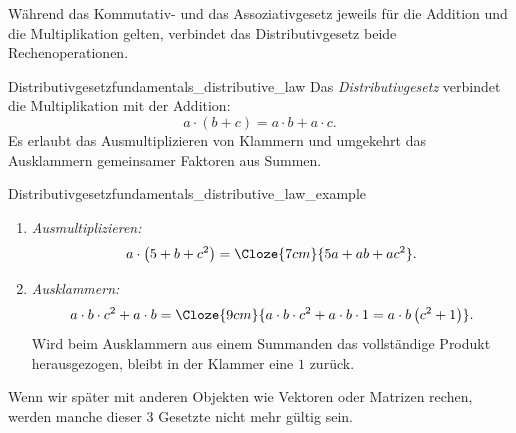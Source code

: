 \noindent\begin{minipage}{\linewidth}
Während das Kommutativ- und das Assoziativgesetz jeweils für die Addition und
die Multiplikation gelten, verbindet das Distributivgesetz beide Rechenoperationen.
%
\begin{DefinitionBox}{Distributivgesetz}{fundamentals_distributive_law}
  Das \emph{Distributivgesetz}  verbindet die
  Multiplikation mit der Addition:
  \[
    a\cdot(b+c)=a\cdot b+a\cdot c.
  \]
  Es erlaubt das Ausmultiplizieren von Klammern und umgekehrt das Ausklammern
  gemeinsamer Faktoren aus Summen.
\end{DefinitionBox}

\begin{ExampleBox}{Distributivgesetz}{fundamentals_distributive_law_example}
  \begin{enumerate}[label=(\alph*),itemsep=0.8em]
    \item \emph{Ausmultiplizieren:}
      \[
        a\cdot\left(5+b+c^2\right)
        =\Cloze{7cm}{5a+ab+ac^2}.
      \]
    \item \emph{Ausklammern:}
      \[
        a\cdot b\cdot c^2+a\cdot b
        =\Cloze{9cm}{a\cdot b\cdot c^2+a\cdot b\cdot 1
          =a\cdot b\left(c^2+1\right)}.
      \]
      Wird beim Ausklammern aus einem Summanden das vollständige Produkt herausgezogen, bleibt in der Klammer eine $1$ zurück.
  \end{enumerate}
\end{ExampleBox}
\end{minipage}

\vspace{1cm}
Wenn wir später mit anderen Objekten wie Vektoren oder Matrizen rechen,
werden manche dieser 3 Gesetzte nicht mehr gültig sein.
